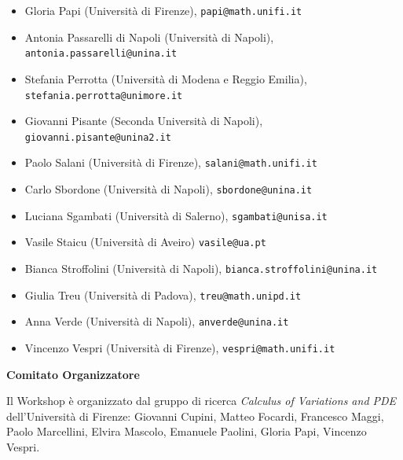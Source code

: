 \documentclass[12pt]{article}
\begin{document}
\begin{itemize}
{\tt paolini@math.unifi.it}
\item[]Gloria Papi  (Universit\`a di Firenze),  
{\tt papi@math.unifi.it} 
\item[]Antonia Passarelli di Napoli  (Universit\`a di Napoli), 
{\tt antonia.passarelli@unina.it} 
\item[]Stefania Perrotta (Universit\`a di Modena e Reggio Emilia), 
{\tt stefania.perrotta@unimore.it} 
\item[]Giovanni Pisante (Seconda Universit\`a di Napoli), 
{\tt giovanni.pisante@unina2.it} 
\item[]Paolo Salani  (Universit\`a di Firenze), 
{\tt salani@math.unifi.it}
\item[]Carlo Sbordone  (Universit\`a di Napoli), 
{\tt sbordone@unina.it} 
\item[]Luciana Sgambati (Universit\`a di Salerno), 
{\tt sgambati@unisa.it} 
\item[]Vasile Staicu (Universit\`a di Aveiro)
{\tt vasile@ua.pt}
\item[]Bianca Stroffolini  (Universit\`a di Napoli), 
{\tt bianca.stroffolini@unina.it} 
\item[]Giulia Treu (Universit\`a di Padova), 
{\tt treu@math.unipd.it} 
\item[]Anna Verde  (Universit\`a di Napoli), 
{\tt anverde@unina.it} 
\item[]Vincenzo Vespri  (Universit\`a di Firenze), 
{\tt vespri@math.unifi.it}

 
\end{itemize}

\vfill

\centerline{\bf Comitato Organizzatore}
\noindent
Il Workshop \`e organizzato dal gruppo di ricerca 
\emph{Calculus of Variations and PDE} dell'Universit\`a di Firenze: 
Giovanni Cupini,
Matteo Focardi,
Francesco Maggi,
Paolo Marcellini,
Elvira Mascolo,
Emanuele Paolini,
Gloria Papi,
Vincenzo Vespri.
\end{document}
